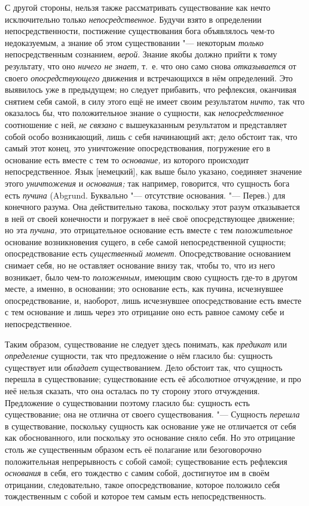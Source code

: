 С другой стороны, нельзя также рассматривать существование как нечто
исключительно только {\em непосредственное}. Будучи
взято в определении непосредственности, постижение существования бога
объявлялось чем-то недоказуемым, а знание об этом существовании "--- некоторым
{\em только} непосредственным сознанием,
{\em верой}. Знание якобы должно прийти к тому
результату, что оно {\em ничего не знает,} т.~е. что
оно само снова {\em отказывается} от своего
{\em опосредствующего} движения и встречающихся в нём
определений. Это выявилось уже в предыдущем; но следует прибавить, что
рефлексия, оканчивая снятием себя самой, в силу этого ещё не имеет своим
результатом {\em ничто,} так что оказалось бы, что
положительное знание о сущности, как
{\em непосредственное} соотношение с ней,
{\em не связано} с вышеуказанным результатом и
представляет собой особо возникающий, лишь с себя начинающий акт; дело
обстоит так, что самый этот конец, это уничтожение опосредствования,
погружение его в основание есть вместе с тем то
{\em основание,} из которого происходит
непосредственное. Язык [немецкий], как выше было указано, соединяет
значение этого {\em уничтожения} и
{\em основания;} так например, говорится, что сущность
бога есть {\em пучина} (Abgrund. Буквально "--- отсутствие
основания. "--- Перев.) для конечного разума. Она действительно такова,
поскольку этот разум отказывается в ней от своей конечности и погружает в
неё своё опосредствующее движение; но эта {\em пучина,}
это отрицательное основание есть вместе с тем
{\em положительное} основание возникновения сущего, в
себе самой непосредственной сущности; опосредствование есть
{\em существенный момент}. Опосредствование основанием
снимает себя, но не оставляет основание внизу так, чтобы то, что из него
возникает, было чем-то {\em положенным,} имеющим свою
сущность где-то в другом месте, а именно, в основании; это основание есть,
как пучина, исчезнувшее опосредствование, и, наоборот, лишь исчезнувшее
опосредствование есть вместе с тем основание и лишь через это отрицание оно
есть равное самому себе и непосредственное.

Таким образом, существование не следует здесь понимать, как
{\em предикат} или
{\em определение} сущности, так что предложение о нём
гласило бы: сущность существует или {\em обладает}
существованием. Дело обстоит так, что сущность перешла в существование;
существование есть её абсолютное отчуждение, и про неё нельзя сказать, что
она осталась по ту сторону этого отчуждения. Предложение о существовании
поэтому гласило бы: сущность есть существование; она не отлична от своего
существования. "--- Сущность {\em перешла} в
существование, поскольку сущность как основание уже не отличается от себя
как обоснованного, или поскольку это основание сняло себя. Но это отрицание
столь же существенным образом есть её полагание или безоговорочно
положительная непрерывность с собой самой; существование есть рефлексия
{\em основания} в себя, его тождество с самим собой,
достигнутое им в своём отрицании, следовательно, такое опосредствование,
которое положило себя тождественным с собой и которое тем самым есть
непосредственность.


